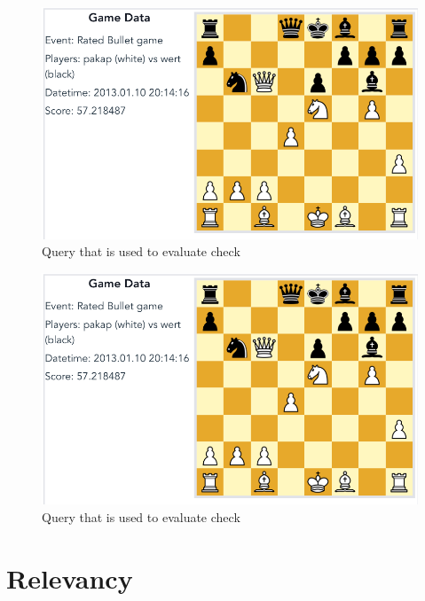 \documentclass[11pt]{article}
\begin{document}
    \begin{figure}[H]
        \centering
        \includegraphics[width=14cm]{images/BlackCheck1-BoReAtDeCh}
        \caption{Query that is used to evaluate check}
        \label{fig:BlackCheck1-BoReAtDeCh}
    \end{figure}

    \begin{figure}[H]
        \centering
        \includegraphics[width=14cm]{images/BlackCheck1-BoReAtDeCh}
        \caption{Query that is used to evaluate check}
        \label{fig:BlackCheck2-BoReAtDeCh}
    \end{figure}


    \section{Relevancy}

\end{document}
